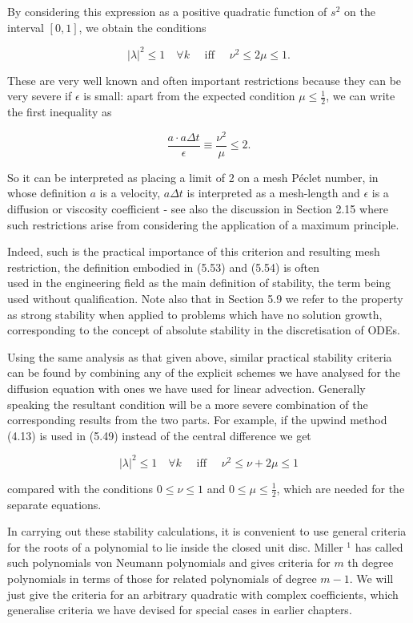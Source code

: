 \documentclass[10pt]{article}
\begin{document}
By considering this expression as a positive quadratic function of \(s^{2}\) on the interval \([0,1]\), we obtain the conditions

\[
|\lambda|^{2} \leq 1 \quad \forall k \quad \text { iff } \quad \nu^{2} \leq 2 \mu \leq 1 .
\]

These are very well known and often important restrictions because they can be very severe if \(\epsilon\) is small: apart from the expected condition \(\mu \leq \frac{1}{2}\), we can write the first inequality as

\[
\frac{a \cdot a \Delta t}{\epsilon} \equiv \frac{\nu^{2}}{\mu} \leq 2 .
\]

So it can be interpreted as placing a limit of 2 on a mesh Péclet number, in whose definition \(a\) is a velocity, \(a \Delta t\) is interpreted as a mesh-length and \(\epsilon\) is a diffusion or viscosity coefficient - see also the discussion in Section 2.15 where such restrictions arise from considering the application of a maximum principle.

Indeed, such is the practical importance of this criterion and resulting mesh restriction, the definition embodied in (5.53) and (5.54) is often\\
used in the engineering field as the main definition of stability, the term being used without qualification. Note also that in Section 5.9 we refer to the property as strong stability when applied to problems which have no solution growth, corresponding to the concept of absolute stability in the discretisation of ODEs.

Using the same analysis as that given above, similar practical stability criteria can be found by combining any of the explicit schemes we have analysed for the diffusion equation with ones we have used for linear advection. Generally speaking the resultant condition will be a more severe combination of the corresponding results from the two parts. For example, if the upwind method (4.13) is used in (5.49) instead of the central difference we get

\[
|\lambda|^{2} \leq 1 \quad \forall k \quad \text { iff } \quad \nu^{2} \leq \nu+2 \mu \leq 1
\]

compared with the conditions \(0 \leq \nu \leq 1\) and \(0 \leq \mu \leq \frac{1}{2}\), which are needed for the separate equations.

In carrying out these stability calculations, it is convenient to use general criteria for the roots of a polynomial to lie inside the closed unit disc. Miller \({ }^{1}\) has called such polynomials von Neumann polynomials and gives criteria for \(m\) th degree polynomials in terms of those for related polynomials of degree \(m-1\). We will just give the criteria for an arbitrary quadratic with complex coefficients, which generalise criteria we have devised for special cases in earlier chapters.
\end{document}
